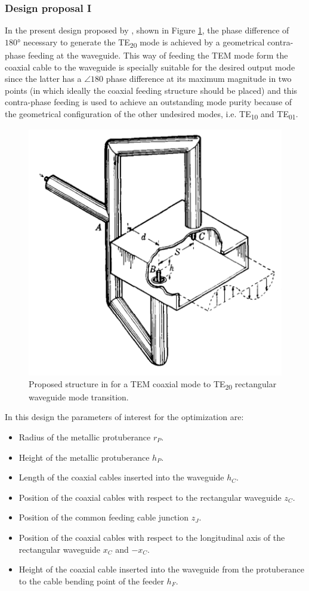 \documentclass[english,twoside]{article}
\begin{document}
		\subsubsection{Design proposal I}
		In the present design proposed by \cite{montgomery}, shown in Figure \ref{fig:book_coax2wrte20_a}, the phase difference of $\ang{180}$ necessary to generate the \ac{TE}\textsubscript{20} mode is achieved by a geometrical contra-phase feeding at the waveguide. This way of feeding the \ac{TEM} mode form the coaxial cable to the waveguide is specially suitable for the desired output mode since the latter has a $\angle{180}$ phase difference at its maximum magnitude in two points (in which ideally the coaxial feeding structure should be placed) and this contra-phase feeding is used to achieve an outstanding mode purity because of the geometrical configuration of the other undesired modes, i.e. \ac{TE}\textsubscript{10} and \ac{TE}\textsubscript{01}.
		
		\begin{figure}[H]
			\centering
			\includegraphics[width=.5\textwidth]{figures/book_coax2wrte20_a}
			\caption{Proposed structure in \cite{montgomery} for a TEM coaxial mode to TE\textsubscript{20} rectangular waveguide mode transition.}
			\label{fig:book_coax2wrte20_a}
		\end{figure}
	
		In this design the parameters of interest for the optimization are:
		\begin{itemize}
			\item Radius of the metallic protuberance $r_P$.
			\item Height of the metallic protuberance $h_P$.			
			\item Length of the coaxial cables inserted into the waveguide $h_C$.
			\item Position of the coaxial cables with respect to the rectangular waveguide $z_C$. 
			\item Position of the common feeding cable junction $z_J$.
			\item Position of the coaxial cables with respect to the longitudinal axis of the rectangular waveguide $x_C$ and $-x_C$.
			\item Height of the coaxial cable inserted into the waveguide from the protuberance to the cable bending point of the feeder $h_F$.
		\end{itemize}
	
\end{document}
